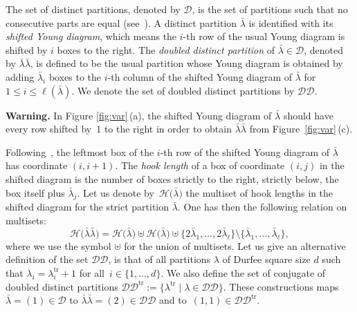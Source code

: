 \documentclass[10pt,a4paper]{amsart}
\numberwithin{equation}{section}
\def\cch{\mathcal H}
\def\ccdd{\mathcal {DD}}
\def\ccd{\mathcal {D}}
\begin{document}
 The set of distinct partitions, denoted by $\ccd$, is the set of partitions such that no consecutive parts are equal (see~\cite{HX,Macbook,Sta99}). A distinct partition $\bar{\lambda}$ is identified with its \textit{shifted Young diagram}, which means the $i$-th row of the usual Young diagram is shifted by $i$ boxes to the right. The \textit{doubled distinct partition} of $\bar{\lambda}\in\ccd$, denoted by $\bar{\lambda}\bar{\lambda}$, is defined to be the usual partition whose Young diagram is obtained by adding $\bar{\lambda}_i$ boxes to the $i$-th column of the shifted Young diagram of $\bar{\lambda}$ for $1\leq i\leq \ell (\bar{\lambda})$.
 We denote the set of doubled distinct partitions by $\ccdd$.


  \textbf{Warning.} In Figure \ref{fig:var}\,(a), the shifted Young diagram of $\bar{\lambda}$ should have every row shifted by~$1$ to the right in order to obtain $\bar{\lambda}\bar{\lambda}$ from Figure~\ref{fig:var}\,(c).



 Following~\cite{HX}, the leftmost box of the $i$-th row of the shifted Young diagram of $\bar{\lambda}$ has coordinate $(i,i+1)$. The \textit{hook length} of a box of coordinate $(i,j)$ in the shifted diagram is the number of boxes strictly to the right, strictly below, the box itself plus $\bar{\lambda}_j$. Let us denote by~$\cch\bigl(\bar{\lambda}\bigr)$ the multiset of hook lengths in the shifted diagram for the strict partition $\bar{\lambda}$. One has then the following relation on multisets:
 \begin{equation}\label{eq:hookdd}
  \cch\bigl(\bar{\lambda}\bar{\lambda}\bigr)=\cch\bigl(\bar{\lambda}\bigr)\uplus\cch\bigl(\bar{\lambda}\bigr)\uplus\bigl\lbrace 2\bar{\lambda}_1,\dots, 2\bar{\lambda}_\ell\bigr\rbrace\setminus\bigl\lbrace \bar{\lambda}_1,\dots ,\bar{\lambda}_\ell\bigr\rbrace,
 \end{equation}
 where we use the symbol $\uplus$ for the union of multisets. Let us give an alternative definition of the set $\ccdd$, is that of all partitions $\lambda$ of Durfee square size $d$ such that ${\lambda_i=\lambda_i^{\mathrm{tr}}+1}$ for all~${i\in\lbrace 1,\dots,d\rbrace}$. We also define the set of conjugate of doubled distinct partitions $\ccdd^{\mathrm{tr}}:=\bigl\lbrace \lambda^{\mathrm{tr}}\mid \lambda\in\ccdd\bigr\rbrace$.
 These constructions maps $\bar{\lambda}=(1)\in\ccd$ to $\bar{\lambda}\bar{\lambda}=(2)\in \ccdd$ and to~${(1,1)\in\ccdd^{\mathrm{tr}}}$.
\end{document}
